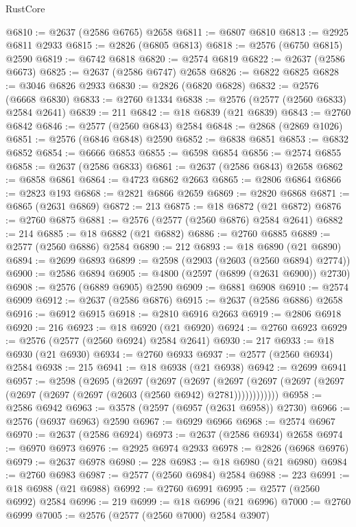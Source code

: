\begin{lexlean}{RustCore}
\begin{coremodule}
@6810 := @2637 (@2586 @6765) @2658
@6811 := @6807 @6810
@6813 := @2925 @6811 @2933
@6815 := @2826 (@6805 @6813)
@6818 := @2576 (@6750 @6815) @2590
@6819 := @6742 @6818
@6820 := @2574 @6819
@6822 := @2637 (@2586 @6673)
@6825 := @2637 (@2586 @6747) @2658
@6826 := @6822 @6825
@6828 := @3046 @6826 @2933
@6830 := @2826 (@6820 @6828)
@6832 := @2576 (@6668 @6830)
@6833 := @2760 @1334
@6838 := @2576 (@2577 (@2560 @6833) @2584 @2641)
@6839 := 211
@6842 := @18 @6839 (@21 @6839)
@6843 := @2760 @6842
@6846 := @2577 (@2560 @6843) @2584
@6848 := @2868 (@2869 @1026)
@6851 := @2576 (@6846 @6848) @2590
@6852 := @6838 @6851
@6853 := @6832 @6852
@6854 := @6666 @6853
@6855 := @6598 @6854
@6856 := @2574 @6855
@6858 := @2637 (@2586 @6833)
@6861 := @2637 (@2586 @6843) @2658
@6862 := @6858 @6861
@6864 := @4723 @6862 @2663
@6865 := @2806 @6864
@6866 := @2823 @193
@6868 := @2821 @6866 @2659
@6869 := @2820 @6868
@6871 := @6865 (@2631 @6869)
@6872 := 213
@6875 := @18 @6872 (@21 @6872)
@6876 := @2760 @6875
@6881 := @2576 (@2577 (@2560 @6876) @2584 @2641)
@6882 := 214
@6885 := @18 @6882 (@21 @6882)
@6886 := @2760 @6885
@6889 := @2577 (@2560 @6886) @2584
@6890 := 212
@6893 := @18 @6890 (@21 @6890)
@6894 := @2699 @6893
@6899 := @2598 (@2903 (@2603 (@2560 @6894) @2774))
@6900 := @2586 @6894
@6905 := @4800 (@2597 (@6899 (@2631 @6900)) @2730)
@6908 := @2576 (@6889 @6905) @2590
@6909 := @6881 @6908
@6910 := @2574 @6909
@6912 := @2637 (@2586 @6876)
@6915 := @2637 (@2586 @6886) @2658
@6916 := @6912 @6915
@6918 := @2810 @6916 @2663
@6919 := @2806 @6918
@6920 := 216
@6923 := @18 @6920 (@21 @6920)
@6924 := @2760 @6923
@6929 := @2576 (@2577 (@2560 @6924) @2584 @2641)
@6930 := 217
@6933 := @18 @6930 (@21 @6930)
@6934 := @2760 @6933
@6937 := @2577 (@2560 @6934) @2584
@6938 := 215
@6941 := @18 @6938 (@21 @6938)
@6942 := @2699 @6941
@6957 := @2598
    (@2695
      (@2697
        (@2697
          (@2697
            (@2697 (@2697 (@2697 (@2697 (@2697 (@2697 (@2697 (@2603 (@2560 @6942) @2781))))))))))))
@6958 := @2586 @6942
@6963 := @3578 (@2597 (@6957 (@2631 @6958)) @2730)
@6966 := @2576 (@6937 @6963) @2590
@6967 := @6929 @6966
@6968 := @2574 @6967
@6970 := @2637 (@2586 @6924)
@6973 := @2637 (@2586 @6934) @2658
@6974 := @6970 @6973
@6976 := @2925 @6974 @2933
@6978 := @2826 (@6968 @6976)
@6979 := @2637 @6978
@6980 := 228
@6983 := @18 @6980 (@21 @6980)
@6984 := @2760 @6983
@6987 := @2577 (@2560 @6984) @2584
@6988 := 223
@6991 := @18 @6988 (@21 @6988)
@6992 := @2760 @6991
@6995 := @2577 (@2560 @6992) @2584
@6996 := 219
@6999 := @18 @6996 (@21 @6996)
@7000 := @2760 @6999
@7005 := @2576 (@2577 (@2560 @7000) @2584 @3907)

\end{coremodule}
\end{lexlean}
